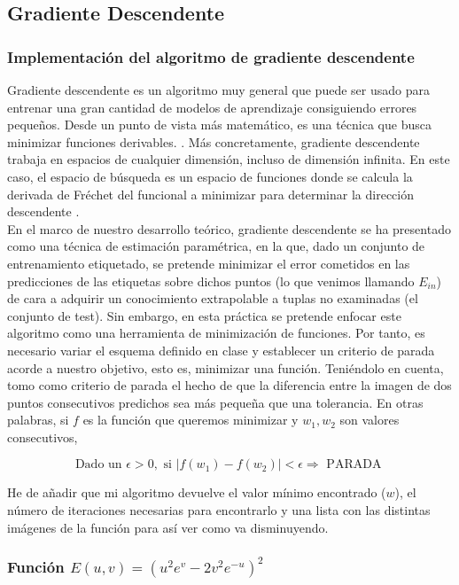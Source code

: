 \subsection{Gradiente Descendente}

\subsubsection{Implementación del algoritmo de gradiente descendente}

Gradiente descendente es un algoritmo muy general que puede ser usado para entrenar una gran cantidad de modelos de aprendizaje consiguiendo errores pequeños. Desde un punto de vista más matemático, es una técnica que busca minimizar funciones derivables. \cite{lfd}. Más concretamente, gradiente descendente trabaja en espacios de cualquier dimensión, incluso de dimensión infinita. En este caso, el espacio de búsqueda es un espacio de funciones donde se calcula la derivada de Fréchet del funcional a minimizar para determinar la dirección descendente \cite{funtional_analysis}. \\

En el marco de nuestro desarrollo teórico, gradiente descendente se ha presentado como una técnica de estimación paramétrica, en la que, dado un conjunto de entrenamiento etiquetado, se pretende minimizar el error cometidos en las predicciones de las etiquetas sobre dichos puntos (lo que venimos llamando $E_{in}$) de cara a adquirir un conocimiento extrapolable a tuplas no examinadas (el conjunto de test). Sin embargo, en esta práctica se pretende enfocar este algoritmo como una herramienta de minimización de funciones. Por tanto, es necesario variar el esquema definido en clase y establecer un criterio de parada acorde a nuestro objetivo, esto es, minimizar una función. Teniéndolo en cuenta, tomo como criterio de parada el hecho de que la diferencia entre la imagen de dos puntos consecutivos predichos sea más pequeña que una tolerancia. En otras palabras, si $f$ es la función que queremos minimizar y $w_1,w_2$ son valores consecutivos,

$$\text{Dado un } \epsilon > 0, \text{ si } |f(w_1)-f(w_2)| < \epsilon \Rightarrow \text{ PARADA }$$


He de añadir que mi algoritmo devuelve el valor mínimo encontrado ($w$), el número de iteraciones necesarias para encontrarlo y una lista con las distintas imágenes de la función para así ver como va disminuyendo.

\subsubsection{Función $E(u,v) = (u^2e^v-2v^2e^{-u})^2$}


